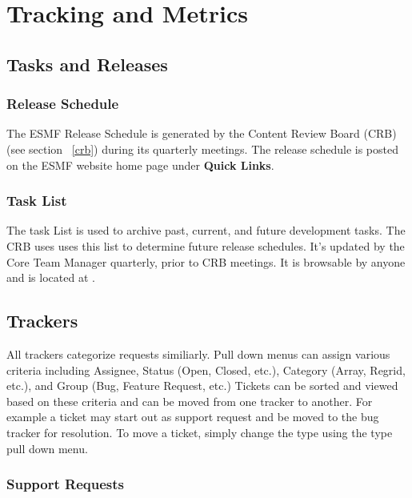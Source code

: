 
\section{Tracking and Metrics}
\label{tracking}

\subsection{Tasks and Releases}
\label{sec:build}

\subsubsection{Release Schedule}
The ESMF Release Schedule is generated by the Content Review Board (CRB) (see section ~\ref{crb}) during its quarterly meetings.  The release schedule is posted on the ESMF website home page under {\bf Quick Links}.

\subsubsection{Task List}

The task List is used to archive past, current, and future development tasks.  The CRB uses uses this list to determine future release schedules.  It's updated by the Core Team Manager quarterly, prior to CRB meetings.  It is browsable by anyone and is located at
 .

\subsection{Trackers}
\label{tracking_tools}

All trackers categorize requests similiarly. Pull down menus can assign various criteria including Assignee, Status (Open, Closed, etc.), Category (Array, Regrid, etc.), and Group (Bug, Feature Request, etc.)  Tickets can be sorted and viewed based on these criteria and can be moved from one tracker to another. For example a ticket may start out as support request and be moved to the bug tracker for resolution.  To move a ticket, simply change the type using the type pull down menu. 

\subsubsection{Support Requests}

